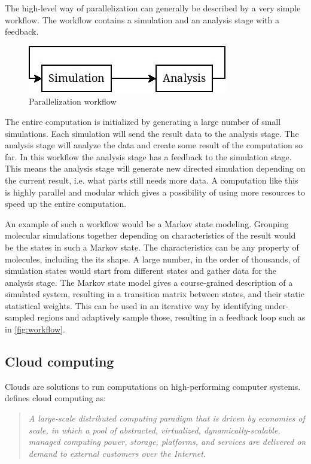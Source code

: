 The high-level way of parallelization can generally be described by a very
simple workflow. The workflow contains a simulation and an analysis
stage with a feedback. 

\begin{figure}[H]  
  \centering
  \includegraphics[scale=0.7]{gfx/simulationfeedback}
  \caption{Parallelization workflow}
  \label{fig:workflow}
\end{figure}

The entire computation is initialized by generating a large number of
small simulations. Each simulation will send the result data to the
analysis stage. The analysis stage will analyze the data and create
some result of the computation so far. In this workflow the analysis
stage has a feedback to the simulation stage. This means the analysis
stage will generate new directed simulation depending on the current
result, i.e. what parts still needs more data. A computation like this
is highly parallel and modular which gives a possibility of using more
resources to speed up the entire computation.

An example of such a workflow would be a Markov state
modeling. Grouping molecular simulations together depending on
characteristics of the result would be the states in such a Markov
state. The characteristics can be any property of molecules, including
the its shape. A large number, in the order of thousands, of
simulation states would start from different states and gather data
for the analysis stage. The Markov state model gives a course-grained
description of a simulated system, resulting in a transition matrix
between states, and their static statistical weights. This can be used
in an iterative way by identifying under-sampled regions and
adaptively sample those, resulting in a feedback loop such as in
\autoref{fig:workflow}.


\subsection{Cloud computing}
Clouds are solutions to run computations on high-performing computer
systems. \citet{foster:2008} defines cloud computing as:

\begin{quote} \slshape
  A large-scale distributed computing paradigm that is driven by
  economies of scale, in which a pool of abstracted, virtualized,
  dynamically-scalable, managed computing power, storage, platforms,
  and services are delivered on demand to external customers over
  the Internet.
\end{quote}

